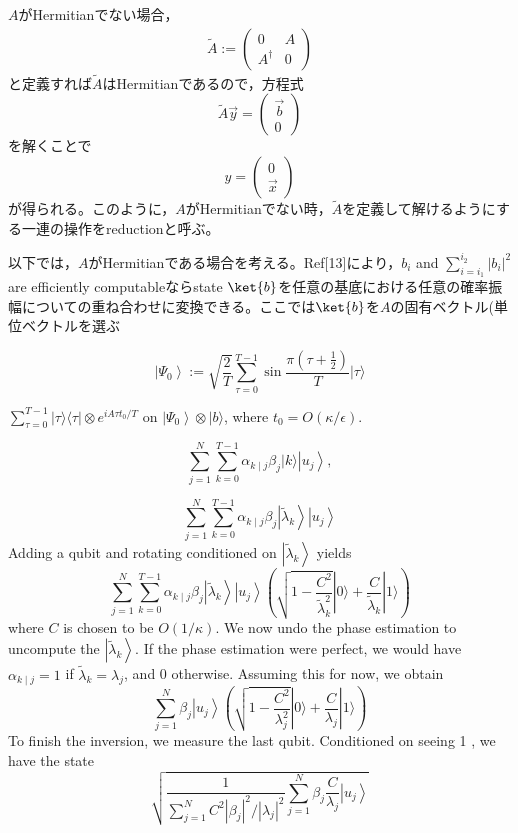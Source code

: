 \documentclass[b5paper,papersize,fleqn]{jsarticle}
\begin{document}
$A$がHermitianでない場合，
\begin{eqnarray}
  \tilde{A}:= \left(\begin{array}{cc}
0 & A \\
A^{\dagger} & 0
\end{array}\right)
\end{eqnarray}
と定義すれば$\tilde{A}$はHermitianであるので，方程式
$$
\tilde{A} \vec{y}=\left(\begin{array}{l}
\vec{b} \\
0
\end{array}\right)
$$
を解くことで
$$
y=\left(\begin{array}{l}
0 \\
\vec{x}
\end{array}\right)
$$
が得られる。このように，$A$がHermitianでない時，$\tilde{A}$を定義して解けるようにする一連の操作をreductionと呼ぶ。

以下では，$A$がHermitianである場合を考える。Ref[13]により，$b_{i}$ and $\sum_{i=i_{1}}^{i_{2}}\left|b_{i}\right|^{2}$ are efficiently computableならstate $\ket{b}$を任意の基底における任意の確率振幅についての重ね合わせに変換できる。ここでは$\ket{b}$を$A$の固有ベクトル(単位ベクトルを選ぶ

$$
\left|\Psi_{0}\right\rangle:=\sqrt{\frac{2}{T}} \sum_{\tau=0}^{T-1} \sin \frac{\pi\left(\tau+\frac{1}{2}\right)}{T}|\tau\rangle
$$

$\sum_{\tau=0}^{T-1}|\tau\rangle\langle\tau| \otimes e^{i A \tau t_{0} / T}$ on $\left|\Psi_{0}\right\rangle \otimes|b\rangle$, where $t_{0}=O(\kappa / \epsilon)$.

$$
\sum_{j=1}^{N} \sum_{k=0}^{T-1} \alpha_{k \mid j} \beta_{j}|k\rangle\left|u_{j}\right\rangle,
$$


$$
\sum_{j=1}^{N} \sum_{k=0}^{T-1} \alpha_{k \mid j} \beta_{j}\left|\tilde{\lambda}_{k}\right\rangle\left|u_{j}\right\rangle
$$
Adding a qubit and rotating conditioned on $\left|\tilde{\lambda}_{k}\right\rangle$ yields
$$
\sum_{j=1}^{N} \sum_{k=0}^{T-1} \alpha_{k \mid j} \beta_{j}\left|\tilde{\lambda}_{k}\right\rangle\left|u_{j}\right\rangle\left(\sqrt{1-\frac{C^{2}}{\tilde{\lambda}_{k}^{2}}}|0\rangle+\frac{C}{\tilde{\lambda}_{k}}|1\rangle\right)
$$
where $C$ is chosen to be $O(1 / \kappa) .$ We now undo the phase estimation to uncompute the $\left|\tilde{\lambda}_{k}\right\rangle .$ If the phase estimation were perfect, we would have $\alpha_{k \mid j}=1$ if $\tilde{\lambda}_{k}=\lambda_{j}$, and 0 otherwise. Assuming this for now, we obtain
$$
\sum_{j=1}^{N} \beta_{j}\left|u_{j}\right\rangle\left(\sqrt{1-\frac{C^{2}}{\lambda_{j}^{2}}}|0\rangle+\frac{C}{\lambda_{j}}|1\rangle\right)
$$
To finish the inversion, we measure the last qubit. Conditioned on seeing 1 , we have the state
$$
\sqrt{\frac{1}{\sum_{j=1}^{N} C^{2}\left|\beta_{j}\right|^{2} /\left|\lambda_{j}\right|^{2}} \sum_{j=1}^{N} \beta_{j} \frac{C}{\lambda_{j}}\left|u_{j}\right\rangle}
$$
\end{document}
